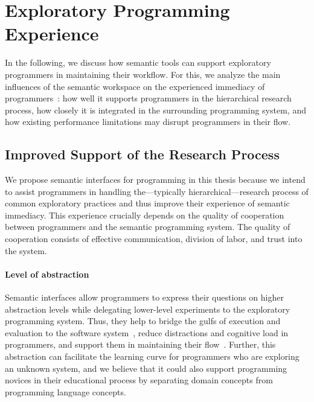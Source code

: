 
\section{Exploratory Programming Experience}
\label{sec:discussion/experience}

In the following, we discuss how semantic tools can support exploratory programmers in maintaining their workflow.
For this, we analyze the main influences of the semantic workspace on the experienced immediacy of programmers~\cite{ungar1997debugging}: how well it supports programmers in the hierarchical research process, how closely it is integrated in the surrounding programming system, and how existing performance limitations may disrupt programmers in their flow.

\subsection*{Improved Support of the Research Process}
\label{sec:discussion/experience/process}

We propose semantic interfaces for programming in this thesis because we intend to assist programmers in handling the---typically hierarchical---research process of common exploratory practices and thus improve their experience of semantic immediacy.
This experience crucially depends on the quality of cooperation between programmers and the semantic programming system.
The quality of cooperation consists of effective communication, division of labor, and trust into the system.

\paragraph{Level of abstraction}
\label{par:discussion/experience/process/abstraction}

Semantic interfaces allow programmers to express their questions on higher abstraction levels while delegating lower-level experiments to the exploratory programming system.
Thus, they help to bridge the gulfs of execution and evaluation to the software system~\cite{norman1986cognitive}, reduce distractions and cognitive load in programmers, and support them in maintaining their flow~\cite{csikszentmihalyi2008flow}.
Further, this abstraction can facilitate the learning curve for programmers who are exploring an unknown system, and we believe that it could also support programming novices in their educational process by separating domain concepts from programming language concepts.

